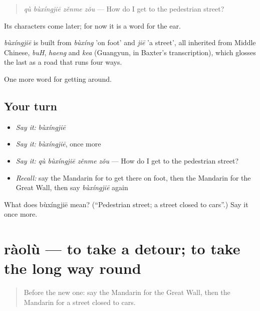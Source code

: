 \begin{quote}
\emph{qù bùxíngjiē zěnme zǒu} — How do I get to the pedestrian street?
\end{quote}

Its characters come later; for now it is a word for the ear.

\begin{cousinweb}
\emph{bùxíngjiē} is built from \emph{bùxíng} 'on foot' and \emph{jiē} 'a street', all inherited from Middle Chinese, \emph{buH}, \emph{haeng} and \emph{kea} (Guangyun, in Baxter's transcription), which glosses the last as a road that runs four ways.
\end{cousinweb}

\begin{grammarlens}[title={What you've built}]
One more word for getting around.
\end{grammarlens}

\subsection*{Your turn}
\begin{itemize}
\raggedright
  \item \emph{Say it:} \emph{bùxíngjiē}
  \item \emph{Say it:} \emph{bùxíngjiē}, once more
  \item \emph{Say it:} \emph{qù bùxíngjiē zěnme zǒu} — How do I get to the pedestrian street?
  \item \emph{Recall:} say the Mandarin for to get there on foot, then the Mandarin for the Great Wall, then say \emph{bùxíngjiē} again
\end{itemize}

\begin{tcolorbox}[breakable,colback=teal!4,colframe=teal!35!black,title={Before you move on}]
What does bùxíngjiē mean? (\textquotedblleft{}Pedestrian street; a street closed to cars\textquotedblright{}.) Say it once more.
\end{tcolorbox}
\section[ràolù]{ràolù — to take a detour; to take the long way round}

\label{lesson:ZH-C447-raolu}



\begin{quote}
Before the new one: say the Mandarin for the Great Wall, then the Mandarin for a street closed to cars.
\end{quote}

